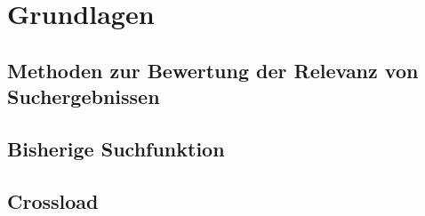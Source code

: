 \chapter{Grundlagen}
\label{ch:grundlagen}


\section{Methoden zur Bewertung der Relevanz von Suchergebnissen}
\section{Bisherige Suchfunktion}
\section{Crossload}
